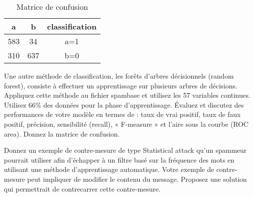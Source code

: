\begin{homeworkProblem}
\begin{homeworkSection}{3.2}
{			}
			\begin{table}
			\centering
			\begin{tabular}{|c|c||c|}
			
			\hline 
			a & b & classification \\ 
			\hline 
			583 & 34 & a=1 \\ 
			\hline 
			310 & 637 & b=0 \\ 
			\hline 
			\end{tabular} 
			\caption{Matrice de confusion}
			\label{tab:confMat32}			
			\end{table}			
			
		\end{homeworkSection}
			
		\begin{homeworkSection}{3.3}

			Une autre méthode de classification, les forêts d’arbres décisionnels (random forest), consiste à
			effectuer un apprentissage sur plusieurs arbres de décisions. Appliquez
			cette méthode au fichier spambase et utilisez les 57 variables continues. Utilisez 66\% des
			données pour la phase d’apprentissage.
			Évaluez et discutez des performances de votre modèle en termes de : taux de vrai positif,
			taux de faux positif, précision, sensibilité (recall), « F-measure » et l’aire sous la courbe
			(ROC area). Donnez la matrice de confusion.

			\problemAnswer{
			
			}
					
		\end{homeworkSection}
		
		\begin{homeworkSection}{3.4}

			Donnez un exemple de contre-mesure de type Statistical attack qu’un spammeur
			pourrait utiliser afin d’échapper à un filtre basé sur la fréquence des mots en utilisant une
			méthode d’apprentissage automatique. Votre exemple de contre-mesure peut impliquer de
			modifier le contenu du message. Proposez une solution qui permettrait de contrecarrer
			cette contre-mesure.

			\problemAnswer{
			
			}
					
		\end{homeworkSection}
		
			
	\end{homeworkProblem}